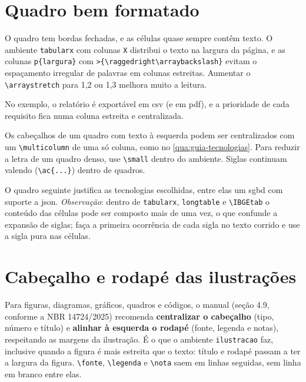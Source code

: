
\section{Quadro bem formatado}

O quadro tem bordas fechadas, e as células quase sempre contêm texto. O ambiente
\texttt{tabularx} com colunas \texttt{X} distribui o texto na largura da página, e as
colunas \texttt{p\{largura\}} com
\texttt{>\{\textbackslash raggedright\textbackslash arraybackslash\}} evitam o
espaçamento irregular de palavras em colunas estreitas. Aumentar o
\texttt{\textbackslash arraystretch} para 1,2 ou 1,3 melhora muito a leitura.

No exemplo, o relatório é exportável em \ac{csv} (e em \ac{pdf}), e a prioridade de cada
requisito fica numa coluna estreita e centralizada.


Os cabeçalhos de um quadro com texto à esquerda podem ser centralizados com um
\texttt{\textbackslash multicolumn} de uma só coluna, como no \autoref{qua:guia-tecnologias}.
Para reduzir a letra de um quadro denso, use \texttt{\textbackslash small} dentro do
ambiente. Siglas continuam valendo (\texttt{\textbackslash ac\{...\}}) dentro de quadros.

O quadro seguinte justifica as tecnologias escolhidas, entre elas um \ac{sgbd} com suporte
a \ac{json}. \emph{Observação}: dentro de \texttt{tabularx}, \texttt{longtable} e
\texttt{\textbackslash IBGEtab} o conteúdo das células pode ser composto mais de uma vez,
o que confunde a expansão de siglas; faça a primeira ocorrência de cada sigla no texto
corrido e use a sigla pura nas células.


\section{Cabeçalho e rodapé das ilustrações}

Para figuras, diagramas, gráficos, quadros e códigos, o manual (seção 4.9, conforme a
NBR 14724/2025) recomenda \textbf{centralizar o cabeçalho} (tipo, número e título) e
\textbf{alinhar à esquerda o rodapé} (fonte, legenda e notas), respeitando as margens da
ilustração. É o que o ambiente \texttt{ilustracao} faz, inclusive quando a figura é mais
estreita que o texto: título e rodapé passam a ter a largura da figura. \texttt{\textbackslash fonte},
\texttt{\textbackslash legenda} e \texttt{\textbackslash nota} saem em linhas seguidas, sem
linha em branco entre elas.

